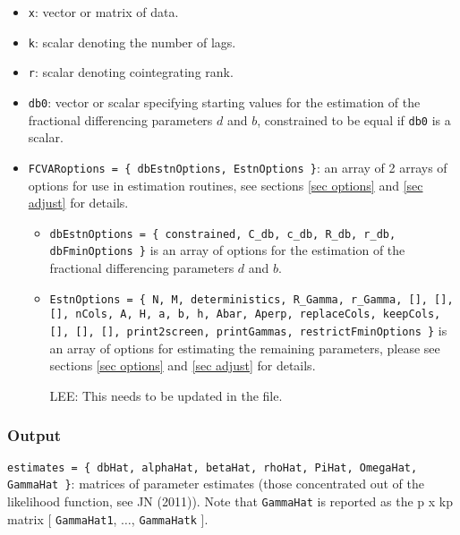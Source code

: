\documentclass[12pt]{article}
\begin{document}
\begin{itemize}

\item \texttt{x}: vector or matrix of data.

\item \texttt{k}: scalar denoting the number of lags.

\item \texttt{r}: scalar denoting cointegrating rank.

\item \texttt{db0}: vector or scalar specifying starting values for the estimation of the fractional differencing parameters $d$ and $b$, constrained to be equal if \texttt{db0} is a scalar.

\item \texttt{FCVARoptions = \{ dbEstnOptions, EstnOptions \}}: an array of 2 arrays of options for use in estimation routines, see sections \ref{sec options} and \ref{sec adjust} for details.

\begin{itemize}

\item \texttt{dbEstnOptions = \{ constrained, C\_db, c\_db, R\_db, r\_db, dbFminOptions \}} is an array of options for the estimation of the fractional differencing parameters $d$ and $b$. 

\item \texttt{EstnOptions = \{ N, M, deterministics, R\_Gamma, r\_Gamma, [], [], [], nCols, A, H, a, b, h, Abar, Aperp, replaceCols, keepCols, [], [], [], print2screen, printGammas, restrictFminOptions \}} is an array of options for estimating the remaining parameters, please see sections \ref{sec options} and \ref{sec adjust} for details.

LEE: This needs to be updated in the file.

\end{itemize}
\end{itemize}

\subsubsection*{Output}

\texttt{estimates = \{ dbHat, alphaHat, betaHat, rhoHat, PiHat, OmegaHat, GammaHat \}}: matrices of parameter estimates (those concentrated out of the likelihood function, see JN (2011)). Note that \texttt{GammaHat} is reported as the p x kp matrix [ \texttt{GammaHat1}, $\ldots$, \texttt{GammaHatk} ].
\end{document}
